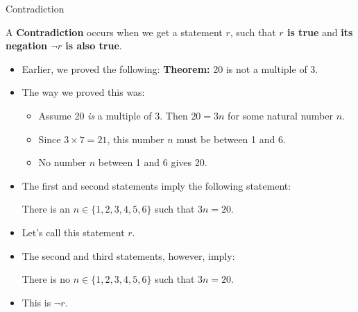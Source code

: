 \documentclass[12pt,aspectratio=1610, handout]{beamer}
\begin{document}
\begin{frame}{Contradiction}
	\begin{definition}[Contradiction]
		A \textbf{Contradiction} occurs when we get a statement $r$, such that \textbf{$r$ is true} and \textbf{its negation $\neg r$ is also true}.
	\end{definition}
	\p
	
	\begin{itemize}
		\item Earlier, we proved the following: \p \textbf{Theorem:} 20 is not a multiple of 3. \p
		
	\end{itemize}
	
	\begin{itemize}
		\item The way we proved this was: 
		\begin{itemize}
			\item Assume 20 \emph{is} a multiple of 3. Then $20 = 3n$ for some natural number $n$. \p
			\item Since $3 \times 7 = 21$, this number $n$ must be between 1 and 6. \p
			\item No number $n$ between 1 and 6 gives 20. \p
		\end{itemize}
		\item The first and second statements imply the following statement: 
		\begin{center}
			There is an $n \in \{1,2,3,4,5,6\}$ such that $3n = 20$.
		\end{center}\p
		
		\item Let's call this statement $r$. \p
		\item The second and third statements, however, imply: \p
		\begin{center}
			There is no $n \in \{1,2,3,4,5,6\}$ such that $3n = 20$.
		\end{center}\p
		\item This is $\neg r$. \p
	\end{itemize}
\end{frame}
\end{document}
